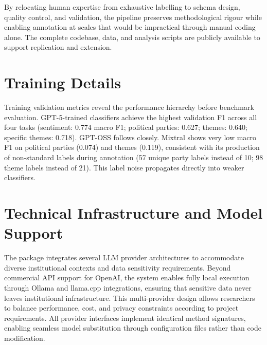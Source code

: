 \documentclass[12pt]{article}
\begin{document}
By relocating human expertise from exhaustive labelling to schema design, quality control, and validation, the pipeline preserves methodological rigour while enabling annotation at scales that would be impractical through manual coding alone. The complete codebase, data, and analysis scripts are publicly available to support replication and extension.



\newpage

\appendix

\section{Training Details}
\label{sec:training-details}





Training validation metrics reveal the performance hierarchy before benchmark evaluation. GPT-5-trained classifiers achieve the highest validation F1 across all four tasks (sentiment: 0.774 macro F1; political parties: 0.627; themes: 0.640; specific themes: 0.718). GPT-OSS follows closely. Mixtral shows very low macro F1 on political parties (0.074) and themes (0.119), consistent with its production of non-standard labels during annotation (57 unique party labels instead of 10; 98 theme labels instead of 21). This label noise propagates directly into weaker classifiers.











\newpage
\section{Technical Infrastructure and Model Support}
\label{sec:technical-infrastructure}

The package integrates several LLM provider architectures to accommodate diverse institutional contexts and data sensitivity requirements. Beyond commercial API support for OpenAI, the system enables fully local execution through Ollama and llama.cpp integrations, ensuring that sensitive data never leaves institutional infrastructure. This multi-provider design allows researchers to balance performance, cost, and privacy constraints according to project requirements. All provider interfaces implement identical method signatures, enabling seamless model substitution through configuration files rather than code modification.
\end{document}
